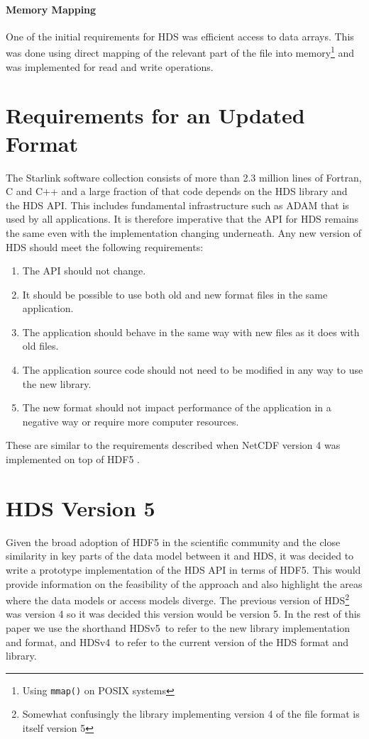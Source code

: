 \documentclass[final,authoryear,5p,times,twocolumn]{elsarticle}
\newcommand{\new}{HDSv5}
\newcommand{\old}{HDSv4}
\begin{document}
\paragraph{Memory Mapping}

One of the initial requirements for HDS was efficient access to data
arrays. This was done using direct mapping of the relevant part of the
file into memory\footnote{Using \texttt{mmap()} on POSIX systems} and
was implemented for read and write operations.

\section{Requirements for an Updated Format}

The Starlink software collection consists of more than 2.3 million
lines of Fortran, C and C++ and a large fraction of that code depends
on the HDS library and the HDS API. This includes fundamental
infrastructure such as ADAM that is used by all applications. It is
therefore imperative that the API for HDS remains the same even with
the implementation changing underneath. Any new version of HDS should
meet the following requirements:

\begin{enumerate}
\item The API should not change.
\item It should be possible to use both old and new format files in
  the same application.
\item The application should behave in the same way with new files as
  it does with old files.
\item The application source code should not need to be modified in
  any way to use the new library.
\item The new format should not impact performance of the application
  in a negative way or require more computer resources.
\end{enumerate}

These are similar to the requirements described when NetCDF version 4
was implemented on top of HDF5 \citep{2004Rew}.

\section{HDS Version 5}

Given the broad adoption of HDF5 in the scientific community and the
close similarity in key parts of the data model between it and HDS, it
was decided to write a prototype implementation of the HDS API in
terms of HDF5. This would provide information on the feasibility of
the approach and also highlight the areas where the data models or
access models diverge. The previous version of HDS\footnote{Somewhat
  confusingly the library implementing version 4 of the file format is
  itself version 5} was version 4 so it
was decided this version would be version 5.
In the rest of this paper we use the shorthand
\new\ to refer to the new library implementation and format, and \old\
to refer to the current version of the HDS format and library.
\end{document}
